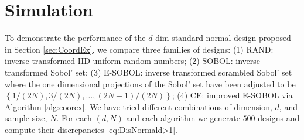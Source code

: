 \documentclass[graybox]{svmult}
\begin{document}




\section{Simulation} \label{sec:Simulation}

To demonstrate the performance of the $d$-dim standard normal design proposed in Section \ref{sec:CoordEx}, we compare three families of designs: (1) RAND: inverse transformed IID uniform random numbers;  (2) SOBOL: inverse transformed Sobol' set; (3) E-SOBOL: inverse transformed scrambled Sobol' set where the one dimensional projections of the Sobol' set have been adjusted to be  $\left\{1/(2N), 3/(2N), \ldots, (2N-1)/(2N) \right\}$; (4) CE: improved E-SOBOL via Algorithm \ref{alg:coorex}. 
We have tried different combinations of dimension, $d$, and sample size, $N$. 
For each $(d,N)$ and each algorithm we generate $500$ designs and compute their discrepancies \eqref{eq:DisNormald>1}.  
\end{document}
